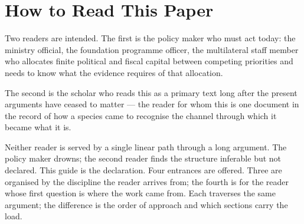 \documentclass[12pt,letterpaper]{article}
\begin{document}
\begin{titlepage}
\begin{abstract}
Easterlin (1981) identified mass schooling as the cause of uneven
development and asked why the whole world wasn't yet developed; his
answer was largely set aside while the field pursued institutions,
geography, and factor accumulation. Tested on its own terms with the
field's own methods, the alternative collapses: log GDP per capita's predictive
power decays within a single generation, and once education's
contribution is residualized out, GDP predicts nothing. Provision
without educated populations produces no durable outcomes.
Institutions are built by educated populations, not the reverse.

\vspace{0.5em}
\noindent\textbf{Keywords:} life-history theory; extended juvenile
dependency; fitness components; vertical cultural transmission;
developmental niche construction; cultural-transmission niche; home
niche; literate cultural transmission; generational lag; mass
schooling; convergence; human development; demographic transition
\end{abstract}

\thispagestyle{empty}
\end{titlepage}

\newpage
\tableofcontents

\newpage
\listoffigures

\newpage
\listoftables

\newpage

\section*{How to Read This Paper}\label{how-to-read}

Two readers are intended. The first is the policy maker who must act
today: the ministry official, the foundation programme officer, the
multilateral staff member who allocates finite political and fiscal
capital between competing priorities and needs to know what the
evidence requires of that allocation.

The second is the scholar who reads this as a primary text long after
the present arguments have ceased to matter --- the reader for whom
this is one document in the record of how a species came to recognise
the channel through which it became what it is.

Neither reader is served by a single linear path through a long
argument. The policy maker drowns; the second reader finds the
structure inferable but not declared. This guide is the declaration.
Four entrances are offered. Three are organised by the discipline the
reader arrives from; the fourth is for the reader whose first question
is where the work came from. Each traverses the same argument; the
difference is the order of approach and which sections carry the load.
\end{document}

